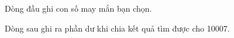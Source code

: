 Dòng đầu ghi con số may mắn bạn chọn.   


   Dòng sau ghi ra phần dư khi chia kết quả tìm được cho 10007.